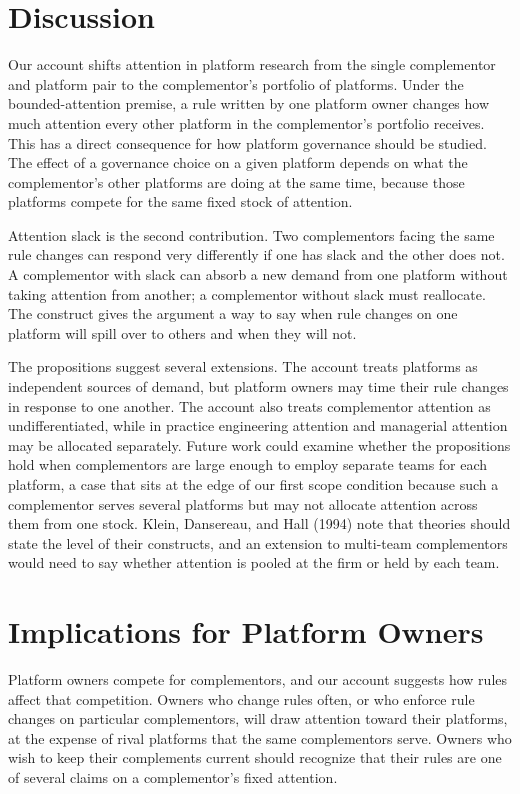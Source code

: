 \documentclass[12pt]{article}
\begin{document}
\section{Discussion}

Our account shifts attention in platform research from the single complementor and platform pair to the complementor's portfolio of platforms. Under the bounded-attention premise, a rule written by one platform owner changes how much attention every other platform in the complementor's portfolio receives. This has a direct consequence for how platform governance should be studied. The effect of a governance choice on a given platform depends on what the complementor's other platforms are doing at the same time, because those platforms compete for the same fixed stock of attention.

Attention slack is the second contribution. Two complementors facing the same rule changes can respond very differently if one has slack and the other does not. A complementor with slack can absorb a new demand from one platform without taking attention from another; a complementor without slack must reallocate. The construct gives the argument a way to say when rule changes on one platform will spill over to others and when they will not.

The propositions suggest several extensions. The account treats platforms as independent sources of demand, but platform owners may time their rule changes in response to one another. The account also treats complementor attention as undifferentiated, while in practice engineering attention and managerial attention may be allocated separately. Future work could examine whether the propositions hold when complementors are large enough to employ separate teams for each platform, a case that sits at the edge of our first scope condition because such a complementor serves several platforms but may not allocate attention across them from one stock. Klein, Dansereau, and Hall (1994) note that theories should state the level of their constructs, and an extension to multi-team complementors would need to say whether attention is pooled at the firm or held by each team.

\section{Implications for Platform Owners}

Platform owners compete for complementors, and our account suggests how rules affect that competition. Owners who change rules often, or who enforce rule changes on particular complementors, will draw attention toward their platforms, at the expense of rival platforms that the same complementors serve. Owners who wish to keep their complements current should recognize that their rules are one of several claims on a complementor's fixed attention.
\end{document}
